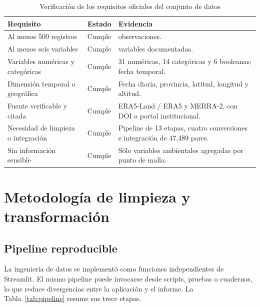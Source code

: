 \documentclass[11pt,a4paper]{article}
\begin{document}
\begin{table}[H]
\centering
\caption{Verificación de los requisitos oficiales del conjunto de datos}
\label{tab:requisitos-datos}
\small
\begin{tabularx}{\textwidth}{X>{\centering\arraybackslash}p{2cm}X}
\toprule
Requisito & Estado & Evidencia \\
\midrule
Al menos 500 registros & Cumple & \NRegistros{} observaciones. \\
Al menos seis variables & Cumple & \NVariables{} variables documentadas. \\
Variables numéricas y categóricas & Cumple & 31 numéricas, 14 categóricas y 6 booleanas; fecha temporal. \\
Dimensión temporal o geográfica & Cumple & Fecha diaria, provincia, latitud, longitud y altitud. \\
Fuente verificable y citada & Cumple & ERA5-Land / ERA5 y MERRA-2, con DOI o portal institucional. \\
Necesidad de limpieza o integración & Cumple & Pipeline de 13 etapas, cuatro conversiones e integración de 47,489 pares. \\
Sin información sensible & Cumple & Sólo variables ambientales agregadas por punto de malla. \\
\bottomrule
\end{tabularx}
\end{table}

\section{Metodología de limpieza y transformación}

\subsection{Pipeline reproducible}

La ingeniería de datos se implementó como funciones independientes de Streamlit. El mismo
pipeline puede invocarse desde scripts, pruebas o cuadernos, lo que reduce divergencias
entre la aplicación y el informe. La Tabla~\ref{tab:pipeline} resume sus trece etapas.
\end{document}
